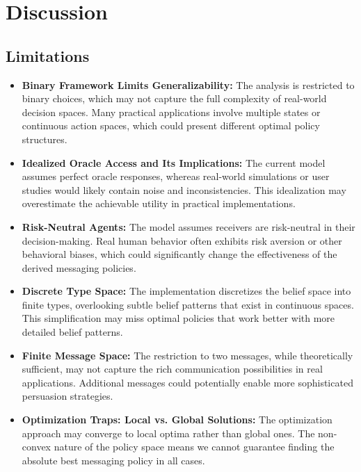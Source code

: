 \documentclass[12pt]{article}
\theoremstyle{plain}
\theoremstyle{definition}
\theoremstyle{remark}
\begin{document}
\section{Discussion}

\subsection{Limitations}

\begin{itemize}
    \item \textbf{Binary Framework Limits Generalizability:} The analysis is restricted to binary choices, which may not capture the full complexity of real-world decision spaces. Many practical applications involve multiple states or continuous action spaces, which could present different optimal policy structures.
    
    \item \textbf{Idealized Oracle Access and Its Implications:} The current model assumes perfect oracle responses, whereas real-world simulations or user studies would likely contain noise and inconsistencies. This idealization may overestimate the achievable utility in practical implementations.
    
    \item \textbf{Risk-Neutral Agents:} The model assumes receivers are risk-neutral in their decision-making. Real human behavior often exhibits risk aversion or other behavioral biases, which could significantly change the effectiveness of the derived messaging policies.
    
    \item \textbf{Discrete Type Space:} The implementation discretizes the belief space into finite types, overlooking subtle belief patterns that exist in continuous spaces. This simplification may miss optimal policies that work better with more detailed belief patterns.
    
    \item \textbf{Finite Message Space:} The restriction to two messages, while theoretically sufficient, may not capture the rich communication possibilities in real applications. Additional messages could potentially enable more sophisticated persuasion strategies.
    
    \item \textbf{Optimization Traps: Local vs. Global Solutions:} The optimization approach may converge to local optima rather than global ones. The non-convex nature of the policy space means we cannot guarantee finding the absolute best messaging policy in all cases.
\end{itemize}
\end{document}
